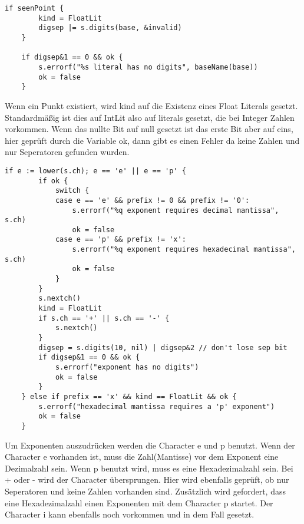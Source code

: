 \begin{lstlisting}
if seenPoint {
		kind = FloatLit
		digsep |= s.digits(base, &invalid)
	}

	if digsep&1 == 0 && ok {
		s.errorf("%s literal has no digits", baseName(base))
		ok = false
	}
\end{lstlisting}
Wenn ein Punkt existiert, wird kind auf die Existenz eines Float Literals gesetzt. Standardmäßig ist dies auf IntLit also auf literals gesetzt, die bei Integer Zahlen vorkommen.
Wenn das nullte Bit auf null gesetzt ist das erste Bit aber auf eins, hier geprüft durch die Variable ok, dann gibt es einen Fehler da keine Zahlen und nur Seperatoren gefunden wurden.
\begin{lstlisting}
if e := lower(s.ch); e == 'e' || e == 'p' {
		if ok {
			switch {
			case e == 'e' && prefix != 0 && prefix != '0':
				s.errorf("%q exponent requires decimal mantissa", s.ch)
				ok = false
			case e == 'p' && prefix != 'x':
				s.errorf("%q exponent requires hexadecimal mantissa", s.ch)
				ok = false
			}
		}
		s.nextch()
		kind = FloatLit
		if s.ch == '+' || s.ch == '-' {
			s.nextch()
		}
		digsep = s.digits(10, nil) | digsep&2 // don't lose sep bit
		if digsep&1 == 0 && ok {
			s.errorf("exponent has no digits")
			ok = false
		}
	} else if prefix == 'x' && kind == FloatLit && ok {
		s.errorf("hexadecimal mantissa requires a 'p' exponent")
		ok = false
	}
\end{lstlisting}
Um Exponenten auszudrücken werden die Character e und p benutzt. Wenn der Character e vorhanden ist, muss die Zahl(Mantisse) vor dem Exponent eine Dezimalzahl sein. Wenn p benutzt wird, muss es eine Hexadezimalzahl sein.
Bei + oder - wird der Character übersprungen. Hier wird ebenfalls geprüft, ob nur Seperatoren und keine Zahlen vorhanden sind. Zusätzlich wird gefordert, dass eine Hexadezimalzahl einen Exponenten mit dem Character p startet. Der Character i kann ebenfalls noch vorkommen und in dem Fall gesetzt. 

